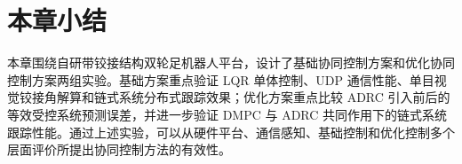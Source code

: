 \documentclass[type=bachelor]{bithesis}
\begin{document}
\FloatBarrier

\section{本章小结}
本章围绕自研带铰接结构双轮足机器人平台，设计了基础协同控制方案和优化协同控制方案两组实验。基础方案重点验证 LQR 单体控制、UDP 通信性能、单目视觉铰接角解算和链式系统分布式跟踪效果；优化方案重点比较 ADRC 引入前后的等效受控系统预测误差，并进一步验证 DMPC 与 ADRC 共同作用下的链式系统跟踪性能。通过上述实验，可以从硬件平台、通信感知、基础控制和优化控制多个层面评价所提出协同控制方法的有效性。

\backmatter





\end{document}
